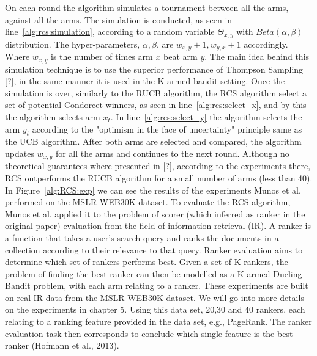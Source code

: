 \documentclass{llncs}
\begin{document}
	On each round the algorithm simulates a tournament between all the arms, against all the arms. 
	The simulation is conducted, as seen in line~\ref{alg:rcs:simulation}, according to a random variable $\Theta_{x,y} $	with $Beta(\alpha,\beta)$ distribution. 
	The hyper-parameters, $\alpha,\beta$, are $w_{x,y}+1,w_{y,x}+1$ accordingly. Where $w_{x,y}$ is the number of times arm $x$ beat arm $y$.
	The main idea behind this simulation technique is to use the superior performance of Thompson Sampling [?], in the same manner it is used in the K-armed bandit setting. 
	Once the simulation is over, similarly to the RUCB algorithm, the RCS algorithm select a set of potential Condorcet winners, as seen in line~\ref{alg:rcs:select_x}, and by this the algorithm selects arm $x_t$.
	In line~\ref{alg:rcs:select_y} the algorithm selects the arm $y_t$ according to the "optimism in the face of uncertainty" principle same as the UCB algorithm.
	After both arms are selected and compared, the algorithm updates $w_{x,y}$ for all the arms and continues to the next round. 
	Although no theoretical guarantees where presented in [?], according to the experiments there, RCS outperforms the RUCB algorithm for a small number of arms (less than 40).	
	In Figure~\ref{alg:RCS:exp} we can see the results of the experiments Munos et al. performed on the MSLR-WEB30K dataset.
	To evaluate the RCS algorithm, Munos et al. applied it to the problem of scorer (which inferred as ranker in the original paper) evaluation from the field of information retrieval (IR). 
	A ranker is a function that takes a user's search query and ranks the documents in a collection according to their relevance to that query. 
	Ranker evaluation aims to determine which set of rankers performs best.
	Given a set of K rankers, the problem of finding the best ranker can then be modelled  as a K-armed Dueling Bandit problem, with each arm relating to a ranker.
	These experiments are built on real IR data from the MSLR-WEB30K dataset.
	We will go into more details on the experiments in chapter 5.
	Using this data set, 20,30 and 40 rankers, each relating to a ranking feature provided in the data set, e.g., PageRank. 
	The ranker evaluation task then corresponds to conclude which single feature is the best ranker (Hofmann et al., 2013).
	
\end{document}
